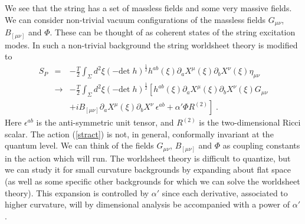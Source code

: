 \documentclass[11pt,a4paper]{article}
\numberwithin{equation}{section}
\numberwithin{table}{section}\setlength{\multlinegap}{25pt}
\newcommand{\bea}{\begin{eqnarray}}  \newcommand{\eea}{\end{eqnarray}}
\newcommand{\nn}{\nonumber}
\begin{document}
We see that the string has a set of massless fields and some very massive fields. 
We can consider non-trivial vacuum configurations of the massless fields $G_{\mu\nu}$, $B_{[\mu\nu]}$ and $\Phi$. These can be thought of as coherent states of the string excitation modes. In such a non-trivial background the string worldsheet theory is modified to
\bea
\label{stract}
S_P &=& -\frac{T}{2} \int_{\Sigma} d^2 \xi \left( - \mathrm{det}\; h \right)^{\frac12} h^{ab}\left( \xi \right) \partial_a X^{\mu}\left(\xi \right) \partial_b X^{\nu}\left(\xi \right) \eta_{\mu\nu} \nn \\
&\rightarrow&  -\frac{T}{2} \int_{\Sigma} d^2 \xi \left( - \mathrm{det}\; h \right)^{\frac12} \left[ h^{ab}\left( \xi \right) \partial_a X^{\mu}\left(\xi \right) \partial_b X^{\nu}\left(\xi \right) G_{\mu\nu} \right. \nn \\ 
& & + \left. i B_{[\mu\nu]} \partial_a X^{\mu}\left(\xi \right) \partial_b X^{\nu}\ \epsilon^{ab} + \alpha' \Phi R^{(2)}\right] \;.
\label{pagen}
\eea
Here $\epsilon^{ab}$ is the anti-symmetric unit tensor, and $R^{(2)}$ is the two-dimensional Ricci scalar. The action (\ref{stract}) is not, in general, conformally invariant at the quantum level. We can think of the fields $G_{\mu\nu}$, $B_{[\mu\nu]}$ and $\Phi$ as coupling constants in the action which will run. The worldsheet theory is difficult to quantize, but we can study it for small curvature backgrounds by expanding about flat space (as well as some specific other backgrounds for which we can solve the worldsheet theory). This expansion is controlled by $\alpha'$ since each derivative, associated to higher curvature, will by dimensional analysis be accompanied with a power of $\alpha'$.
\end{document}
